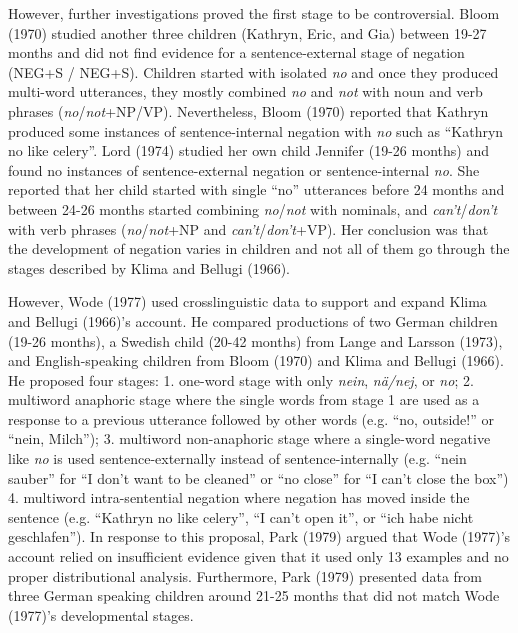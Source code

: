 \documentclass[man,floatsintext,draftall]{apa6}
\begin{document}
However, further investigations proved the first stage to be controversial. Bloom (1970) studied another three children (Kathryn, Eric, and Gia) between 19-27 months and did not find evidence for a sentence-external stage of negation (NEG+S / NEG+S). Children started with isolated \emph{no} and once they produced multi-word utterances, they mostly combined \emph{no} and \emph{not} with noun and verb phrases (\emph{no}/\emph{not}+NP/VP). Nevertheless, Bloom (1970) reported that Kathryn produced some instances of sentence-internal negation with \emph{no} such as \enquote{Kathryn no like celery}. Lord (1974) studied her own child Jennifer (19-26 months) and found no instances of sentence-external negation or sentence-internal \emph{no}. She reported that her child started with single \enquote{no} utterances before 24 months and between 24-26 months started combining \emph{no}/\emph{not} with nominals, and \emph{can't}/\emph{don't} with verb phrases (\emph{no}/\emph{not}+NP and \emph{can't}/\emph{don't}+VP). Her conclusion was that the development of negation varies in children and not all of them go through the stages described by Klima and Bellugi (1966).

However, Wode (1977) used crosslinguistic data to support and expand Klima and Bellugi (1966)'s account. He compared productions of two German children (19-26 months), a Swedish child (20-42 months) from Lange and Larsson (1973), and English-speaking children from Bloom (1970) and Klima and Bellugi (1966). He proposed four stages: 1. one-word stage with only \emph{nein}, \emph{nä/nej}, or \emph{no}; 2. multiword anaphoric stage where the single words from stage 1 are used as a response to a previous utterance followed by other words (e.g. \enquote{no, outside!} or \enquote{nein, Milch}); 3. multiword non-anaphoric stage where a single-word negative like \emph{no} is used sentence-externally instead of sentence-internally (e.g. \enquote{nein sauber} for \enquote{I don't want to be cleaned} or \enquote{no close} for \enquote{I can't close the box}) 4. multiword intra-sentential negation where negation has moved inside the sentence (e.g. \enquote{Kathryn no like celery}, \enquote{I can't open it}, or \enquote{ich habe nicht geschlafen}). In response to this proposal, Park (1979) argued that Wode (1977)'s account relied on insufficient evidence given that it used only 13 examples and no proper distributional analysis. Furthermore, Park (1979) presented data from three German speaking children around 21-25 months that did not match Wode (1977)'s developmental stages.
\end{document}
